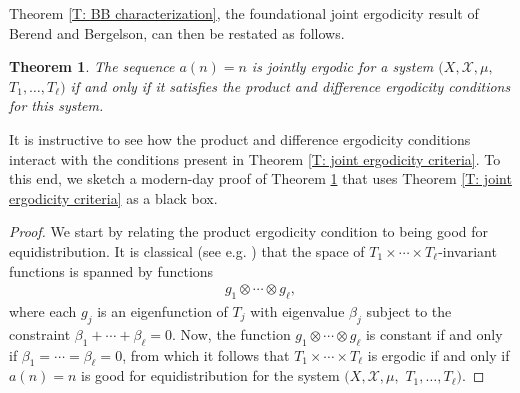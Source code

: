 \documentclass[11pt]{amsart}
\newtheorem{theorem}[lemma]{Theorem}
\theoremstyle{definition}
\newcommand{\CX}{{\mathcal X}}
\newcommand{\1}{{\mathbf{1}}}
\begin{document}
    
    Theorem \ref{T: BB characterization}, the foundational joint ergodicity result of Berend and Bergelson, can then be restated as follows.
    \begin{theorem}\label{T: BB characterization 2} The sequence $a(n) = n$ is jointly ergodic for a system $(X, \CX, \mu,$\! $T_1, \ldots, T_\ell)$ if and only if it satisfies the product and difference ergodicity conditions for this system. 
    \end{theorem}    
    It is instructive to see how the product and difference ergodicity conditions interact with the conditions present in Theorem \ref{T: joint ergodicity criteria}. To this end, we sketch a modern-day proof of Theorem \ref{T: BB characterization 2} that uses Theorem \ref{T: joint ergodicity criteria} as a black box.
    \begin{proof}%
        We start by relating the product ergodicity condition to being good for equidistribution. It is classical (see e.g. \cite[Chapter 4, Theorem 16]{HK18}) that the space of $T_1\times \cdots \times T_\ell$-invariant functions 
        is spanned by functions 
        \begin{align*}
            g_1 \otimes \cdots \otimes g_\ell,
        \end{align*}
        where each $g_j$ is an eigenfunction of $T_j$ with eigenvalue $\beta_j$ subject to the constraint $\beta_1 + \cdots + \beta_\ell = 0$. Now, the function $g_1 \otimes \cdots \otimes g_\ell$ is constant if and only if $\beta_1 = \cdots = \beta_\ell = 0$, from which it follows that $T_1 \times \cdots \times T_\ell$ is ergodic if and only if $a(n) = n$ is good for equidistribution for the system $(X, \CX, \mu,$\! $T_1, \ldots, T_\ell)$. 
        

\end{proof}
\end{document}
